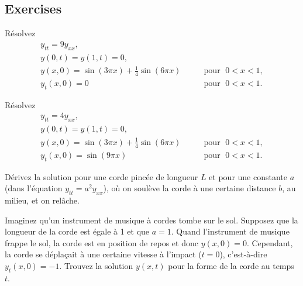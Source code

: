 \subsection{Exercises}

\begin{exercise}
Résolvez
\begin{equation*}
\begin{array}{ll}
y_{tt} = 9 y_{xx} , &  \\
y(0,t) = y(1,t) = 0 , &  \\
y(x,0) = \sin (3\pi x) + \frac{1}{4} \sin (6 \pi x) & \qquad \text{pour } \; 0 < x < 1 , \\
y_t(x,0) = 0 & \qquad \text{pour } \; 0 < x < 1 .
\end{array}
\end{equation*}
\end{exercise}

\begin{exercise}
Résolvez
\begin{equation*}
\begin{array}{ll}
y_{tt} = 4 y_{xx} , &  \\
y(0,t) = y(1,t) = 0 , &  \\
y(x,0) = \sin (3\pi x) + \frac{1}{4} \sin (6 \pi x) & \qquad \text{pour } \; 0 < x < 1 , \\
y_t(x,0) = \sin (9 \pi x) & \qquad \text{pour } \; 0 < x < 1 .
\end{array}
\end{equation*}
\end{exercise}

\begin{exercise}
Dérivez la solution pour une corde pincée de longueur $ L $ et pour
une constante $ a $ (dans l'équation $y_{tt} = a^2 y_{xx}$),  où on soulève la corde  à une certaine distance $ b $, au milieu, et on relâche.
\end{exercise}

\begin{samepage}
\begin{exercise}
Imaginez qu'un instrument de musique à cordes tombe sur le sol.  Supposez que
la longueur de la corde est égale à 1 et que $ a = 1 $.  Quand l'instrument de musique frappe
le sol,  la corde est en position de repos et donc $ y (x, 0) = 0 $.  Cependant,
la corde se déplaçait à une certaine vitesse à l'impact ($ t = 0 $),
c'est-à-dire $ y_t (x, 0) = -1 $.  Trouvez la solution
$ y (x, t) $ pour la forme de la corde au temps $ t $.
\end{exercise}
\end{samepage}

